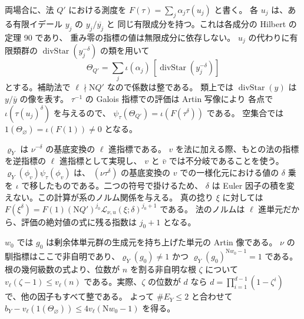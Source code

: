 両場合に、法 \(Q'\) における測度を
\(F(\tau)=\sum_j\alpha_j\tau(u_j)\) と書く。
各 \(u_j\) は、ある有限イデール \(y_j\) の \(y_j/\overline{y_j}\) と
同じ有限成分を持つ。これは各成分の Hilbert の定理 90 であり、
重み零の指標の値は無限成分に依存しない。
\(u_j\) の代わりに有限類群の \(\operatorname{divStar}(y_j^{-\delta})\) の類を用いて
\[
 \Theta_{Q'}=\sum_j\iota(\alpha_j)\,[\operatorname{divStar}(y_j^{-\delta})]
\]
とする。補助法で \(\ell\nmid\mathrm NQ'\) なので係数は整である。
類上では \(\operatorname{divStar}(y)\) は \(y/\bar y\) の像を表す。
\(\tau^{-1}\) の Galois 指標での評価は Artin 写像により
各点で \(\iota(\tau(u_j)^\delta)\) を与えるので、
\(\psi_\tau(\Theta_{Q'})=\iota(F(\tau^\delta))\) である。
空集合では \(1(\Theta_\varnothing)=\iota(F(1))\ne0\) となる。

\(\varrho_Y\) は \(\nu^{-\delta}\) の基底変換の \(\ell\) 進指標である。
\(v\) を法に加える際、もとの法の指標を逆指標の \(\ell\) 進指標として実現し、
\(v\) と \(\bar v\) では不分岐であることを使う。
\(\varrho_Y(\phi_v)\psi_\tau(\phi_v)\) は、
\((\nu\tau^\delta)\) の基底変換の \(v\) での一様化元における値の
\(\delta\) 乗を \(\iota\) で移したものである。二つの符号で掛けるため、
\(\delta\) は Euler 因子の積を変えない。この計算が系のノルム関係を与える。
真の捻り \(\xi\) に対しては
\(F(\xi^\delta)=F(1)(\mathrm NQ')^{j_0}\mathcal L_{\nu,u}(\xi;\delta)^{j_0+1}\) である。
法のノルムは \(\ell\) 進単元だから、評価の絶対値の式に残る指数は \(j_0+1\) となる。

\(w_0\) では \(g_0\) は剰余体単元群の生成元を持ち上げた単元の Artin 像である。
\(\nu\) の馴指標はここで非自明であり、\(\varrho_Y(g_0)\ne1\) かつ
\(\varrho_Y(g_0)^{\mathrm Nw_0-1}=1\) である。
根の幾何級数の式より、位数が \(n\) を割る非自明な根 \(\zeta\) について
\(v_\ell(\zeta-1)\le v_\ell(n)\) である。実際、\(\zeta\) の位数が \(d\) なら
\(d=\prod_{i=1}^{d-1}(1-\zeta^i)\) で、他の因子もすべて整である。
よって \(\#E_Y\le2\) と合わせて
\(b_Y-v_\ell(1(\Theta_\varnothing))\le4v_\ell(\mathrm Nw_0-1)\) を得る。
